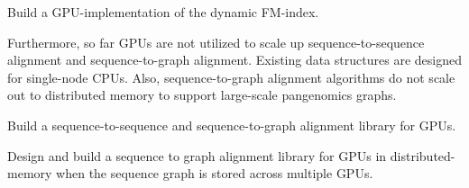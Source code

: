 \begin{rproblem}
Build a GPU-implementation of the dynamic FM-index.
\label{rpob:gpu-fmindex}
\end{rproblem}


Furthermore, so far GPUs are not utilized to scale up sequence-to-sequence alignment and sequence-to-graph alignment. Existing data structures are designed for single-node CPUs. Also, sequence-to-graph alignment algorithms do not scale out to distributed memory to support large-scale pangenomics graphs. 

\begin{rproblem}
Build a sequence-to-sequence and sequence-to-graph alignment library for GPUs.
\end{rproblem}

\begin{rproblem}
Design and build a sequence to graph alignment library for GPUs in distributed-memory when the sequence graph is stored across multiple GPUs.
\end{rproblem}

